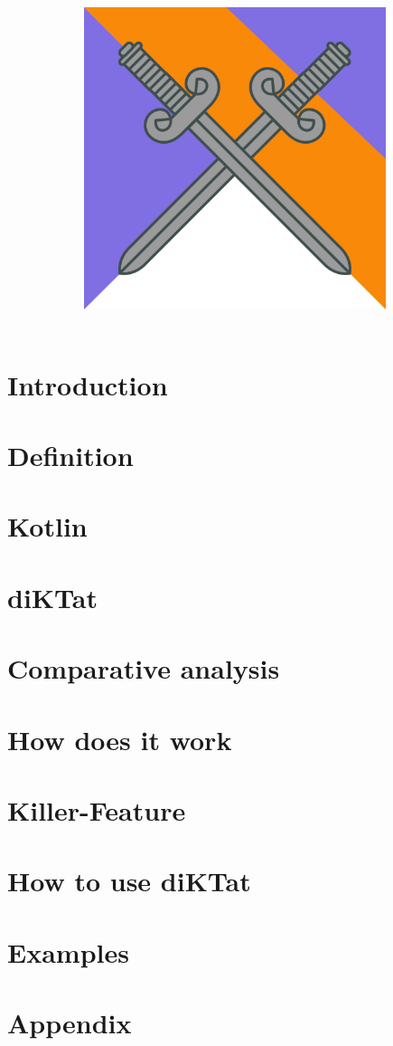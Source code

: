 \documentclass{article}
\title{
  \includegraphics[height=250pt]{wp/pictures/logo.png}\\
  }
\begin{document}
\author{}
\maketitle
\pagebreak
\renewcommand{\cftsecleader}{\cftdotfill{\cftdotsep}}
\tableofcontents
\pagebreak

\section{Introduction}
\label{sec:intro}


\section{Definition}
\label{sec:definition}


\section{Kotlin}
\label{sec:kotlin}


\section{diKTat}
\label{sec:diKTat}


\section{Comparative analysis}
\label{sec:compare}


\section{How does it work}
\label{sec:work}


\section{Killer-Feature}
\label{sec:feature}


\section{How to use diKTat}
\label{sec:download}


\section{Examples}
\label{sec:examples}


\section{Appendix}
\label{sec:appendix}

\end{document}
